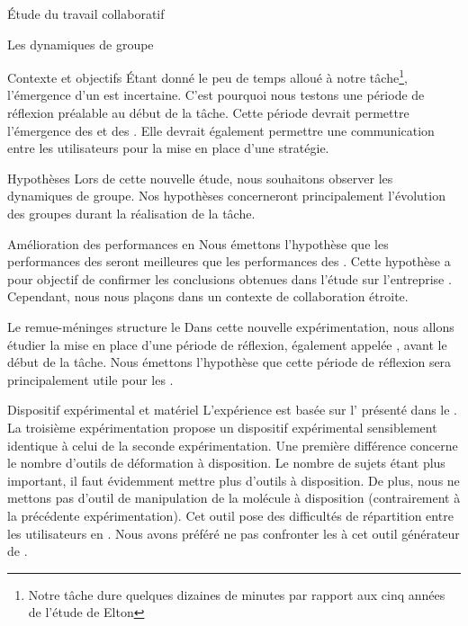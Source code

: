 \documentclass[myfrancais]{mythesis}
\begin{document}
\begin{mypart}{Étude du travail collaboratif}
\begin{mychapter}{Les dynamiques de groupe}
\begin{mysection}{Contexte et objectifs}
				Étant donné le peu de temps alloué à notre tâche\footnote{Notre tâche dure quelques dizaines de minutes par rapport aux cinq années de l'étude de Elton }, l'émergence d'un  est incertaine.
				C'est pourquoi nous testons une période de réflexion préalable au début de la tâche.
				Cette période devrait permettre l'émergence des  et des .
				Elle devrait également permettre une communication entre les utilisateurs pour la mise en place d'une stratégie.
				\begin{mysubsection}{Hypothèses}
					Lors de cette nouvelle étude, nous souhaitons observer les dynamiques de groupe.
					Nos hypothèses concerneront principalement l'évolution des groupes durant la réalisation de la tâche.
					\begin{myparagraph}{ Amélioration des performances en }
						Nous émettons l'hypothèse que les performances des  seront meilleures que les performances des .
						Cette hypothèse a pour objectif de confirmer les conclusions obtenues dans l'étude sur l'entreprise \myHawthorne.
						Cependant, nous nous plaçons dans un contexte de collaboration étroite.
					\end{myparagraph}
					\begin{myparagraph}{ Le remue-méninges structure le }
						Dans cette nouvelle expérimentation, nous allons étudier la mise en place d'une période de réflexion, également appelée , avant le début de la tâche.
						Nous émettons l'hypothèse que cette période de réflexion sera principalement utile pour les .
					\end{myparagraph}
				\end{mysubsection}
			\end{mysection}
			\begin{mysection}{Dispositif expérimental et matériel}
				L'expérience est basée sur l' présenté dans le .
				La troisième expérimentation propose un dispositif expérimental sensiblement identique à celui de la seconde expérimentation.
				Une première différence concerne le nombre d'outils de déformation à disposition.
				Le nombre de sujets étant plus important, il faut évidemment mettre plus d'outils à disposition.
				De plus, nous ne mettons pas d'outil de manipulation de la molécule à disposition (contrairement à la précédente expérimentation).
				Cet outil pose des difficultés de répartition entre les utilisateurs en .
				Nous avons préféré ne pas confronter les  à cet outil générateur de .


\end{mysection}
\end{mychapter}
\end{mypart}
\end{document}
